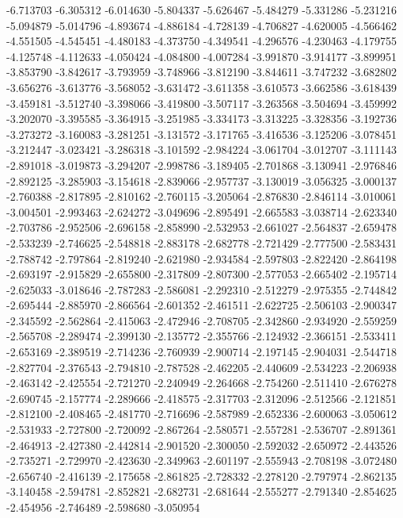 -6.713703
-6.305312
-6.014630
-5.804337
-5.626467
-5.484279
-5.331286
-5.231216
-5.094879
-5.014796
-4.893674
-4.886184
-4.728139
-4.706827
-4.620005
-4.566462
-4.551505
-4.545451
-4.480183
-4.373750
-4.349541
-4.296576
-4.230463
-4.179755
-4.125748
-4.112633
-4.050424
-4.084800
-4.007284
-3.991870
-3.914177
-3.899951
-3.853790
-3.842617
-3.793959
-3.748966
-3.812190
-3.844611
-3.747232
-3.682802
-3.656276
-3.613776
-3.568052
-3.631472
-3.611358
-3.610573
-3.662586
-3.618439
-3.459181
-3.512740
-3.398066
-3.419800
-3.507117
-3.263568
-3.504694
-3.459992
-3.202070
-3.395585
-3.364915
-3.251985
-3.334173
-3.313225
-3.328356
-3.192736
-3.273272
-3.160083
-3.281251
-3.131572
-3.171765
-3.416536
-3.125206
-3.078451
-3.212447
-3.023421
-3.286318
-3.101592
-2.984224
-3.061704
-3.012707
-3.111143
-2.891018
-3.019873
-3.294207
-2.998786
-3.189405
-2.701868
-3.130941
-2.976846
-2.892125
-3.285903
-3.154618
-2.839066
-2.957737
-3.130019
-3.056325
-3.000137
-2.760388
-2.817895
-2.810162
-2.760115
-3.205064
-2.876830
-2.846114
-3.010061
-3.004501
-2.993463
-2.624272
-3.049696
-2.895491
-2.665583
-3.038714
-2.623340
-2.703786
-2.952506
-2.696158
-2.858990
-2.532953
-2.661027
-2.564837
-2.659478
-2.533239
-2.746625
-2.548818
-2.883178
-2.682778
-2.721429
-2.777500
-2.583431
-2.788742
-2.797864
-2.819240
-2.621980
-2.934584
-2.597803
-2.822420
-2.864198
-2.693197
-2.915829
-2.655800
-2.317809
-2.807300
-2.577053
-2.665402
-2.195714
-2.625033
-3.018646
-2.787283
-2.586081
-2.292310
-2.512279
-2.975355
-2.744842
-2.695444
-2.885970
-2.866564
-2.601352
-2.461511
-2.622725
-2.506103
-2.900347
-2.345592
-2.562864
-2.415063
-2.472946
-2.708705
-2.342860
-2.934920
-2.559259
-2.565708
-2.289474
-2.399130
-2.135772
-2.355766
-2.124932
-2.366151
-2.533411
-2.653169
-2.389519
-2.714236
-2.760939
-2.900714
-2.197145
-2.904031
-2.544718
-2.827704
-2.376543
-2.794810
-2.787528
-2.462205
-2.440609
-2.534223
-2.206938
-2.463142
-2.425554
-2.721270
-2.240949
-2.264668
-2.754260
-2.511410
-2.676278
-2.690745
-2.157774
-2.289666
-2.418575
-2.317703
-2.312096
-2.512566
-2.121851
-2.812100
-2.408465
-2.481770
-2.716696
-2.587989
-2.652336
-2.600063
-3.050612
-2.531933
-2.727800
-2.720092
-2.867264
-2.580571
-2.557281
-2.536707
-2.891361
-2.464913
-2.427380
-2.442814
-2.901520
-2.300050
-2.592032
-2.650972
-2.443526
-2.735271
-2.729970
-2.423630
-2.349963
-2.601197
-2.555943
-2.708198
-3.072480
-2.656740
-2.416139
-2.175658
-2.861825
-2.728332
-2.278120
-2.797974
-2.862135
-3.140458
-2.594781
-2.852821
-2.682731
-2.681644
-2.555277
-2.791340
-2.854625
-2.454956
-2.746489
-2.598680
-3.050954
